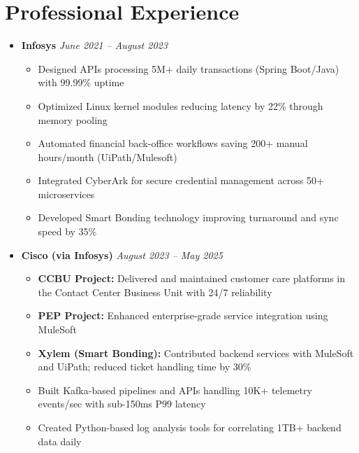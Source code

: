 \documentclass[letterpaper,11pt]{article}
\begin{document}
\section*{Professional Experience}\vspace{6pt}
\begin{itemize}
    \item \textbf{Infosys} \hfill \textit{June 2021 -- August 2023}
    \begin{itemize}
        \item Designed APIs processing 5M+ daily transactions (Spring Boot/Java) with 99.99\% uptime
        \item Optimized Linux kernel modules reducing latency by 22\% through memory pooling
        \item Automated financial back-office workflows saving 200+ manual hours/month (UiPath/Mulesoft)
        \item Integrated CyberArk for secure credential management across 50+ microservices
        \item Developed Smart Bonding technology improving turnaround and sync speed by 35\%
    \end{itemize}

    \item \textbf{Cisco (via Infosys)} \hfill \textit{August 2023 -- May 2025}
    \begin{itemize}
        \item \textbf{CCBU Project:} Delivered and maintained customer care platforms in the Contact Center Business Unit with 24/7 reliability
        \item \textbf{PEP Project:} Enhanced enterprise-grade service integration using MuleSoft
        \item \textbf{Xylem (Smart Bonding):} Contributed backend services with MuleSoft and UiPath; reduced ticket handling time by 30\%
        \item Built Kafka-based pipelines and APIs handling 10K+ telemetry events/sec with sub-150ms P99 latency
        \item Created Python-based log analysis tools for correlating 1TB+ backend data daily
    \end{itemize}
\end{itemize}
\end{document}
